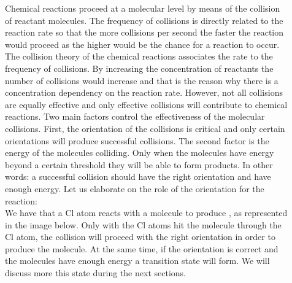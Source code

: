 \documentclass[main.tex]{subfiles}
\newcommand\chapterlabel{kinetics}
\begin{document}
\begin{description}
\item[] 
Chemical reactions proceed at a molecular level by means of the collision of reactant molecules. The frequency of collisions is directly related to the reaction rate so that the more collisions per second the faster the reaction would proceed as the higher would be the chance for a reaction to occur. The collision theory of the chemical reactions associates the rate to the frequency of collisions. By increasing the concentration of reactants the number of collisions would increase and that is the reason why there is a concentration dependency on the reaction rate. However, not all collisions are equally effective and only effective collisions will contribute to chemical reactions. Two main factors control the effectiveness of the molecular collisions. First, the orientation of the collisions is critical and only certain orientations will produce successful collisions. The second factor is the energy of the molecules colliding. Only when the molecules have energy beyond a certain threshold they will be able to form products. In other words: a successful collision should have the right orientation and have enough energy. Let us elaborate on the role of the orientation for the reaction:
\\
We have that a Cl atom reacts with a  molecule to produce , as represented in the image below. Only with the Cl atoms hit the  molecule through the Cl atom, the collision will proceed with the right orientation in order to produce the  molecule. At the same time, if the orientation is correct and the molecules have enough energy a transition state will form. We will discuss more this state during the next sections.\\
\vspace{5cm}\hspace{-4cm}
\begin{minipage}[t]{1.7\linewidth}
\vspace{2cm}
     \label{Fig:{\chapterlabel}\thefigurenewcounter}


\end{minipage}
\end{description}
\end{document}
